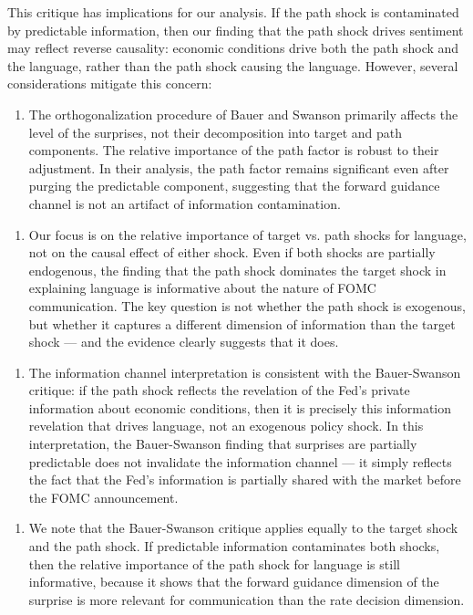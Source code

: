 \documentclass[12pt]{article}
\begin{document}
This critique has implications for our analysis. If the path shock is contaminated by predictable information, then our finding that the path shock drives sentiment may reflect reverse causality: economic conditions drive both the path shock and the language, rather than the path shock causing the language. However, several considerations mitigate this concern:

\begin{enumerate}
\item The orthogonalization procedure of Bauer and Swanson primarily affects the level of the surprises, not their decomposition into target and path components. The relative importance of the path factor is robust to their adjustment. In their analysis, the path factor remains significant even after purging the predictable component, suggesting that the forward guidance channel is not an artifact of information contamination.
\end{enumerate}

\begin{enumerate}
\item Our focus is on the relative importance of target vs. path shocks for language, not on the causal effect of either shock. Even if both shocks are partially endogenous, the finding that the path shock dominates the target shock in explaining language is informative about the nature of FOMC communication. The key question is not whether the path shock is exogenous, but whether it captures a different dimension of information than the target shock --- and the evidence clearly suggests that it does.
\end{enumerate}

\begin{enumerate}
\item The information channel interpretation is consistent with the Bauer-Swanson critique: if the path shock reflects the revelation of the Fed's private information about economic conditions, then it is precisely this information revelation that drives language, not an exogenous policy shock. In this interpretation, the Bauer-Swanson finding that surprises are partially predictable does not invalidate the information channel --- it simply reflects the fact that the Fed's information is partially shared with the market before the FOMC announcement.
\end{enumerate}

\begin{enumerate}
\item We note that the Bauer-Swanson critique applies equally to the target shock and the path shock. If predictable information contaminates both shocks, then the relative importance of the path shock for language is still informative, because it shows that the forward guidance dimension of the surprise is more relevant for communication than the rate decision dimension.
\end{enumerate}
\end{document}

